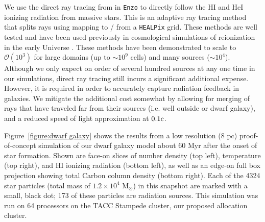 \documentclass[11pt]{article}
\begin{document}
We use the direct ray tracing from \cite{WiseAbel2011} in \texttt{Enzo} to directly follow the HI and HeI ionizing radiation from massive stars. This is an adaptive ray tracing method that splits rays using mapping to / from a \texttt{HEALPix} grid. These methods are well tested and have been used previously in cosmological simulations of reionization in the early Universe \citep{Wise2012a, WiseAbel2012,Wise2014, Kim2013a, Kim2013b}. These methods have been demonstrated to scale to $\mathcal{O}(10^{3})$ for large domains (up to $\sim 10^9$ cells) and many sources ($\sim10^{4}$). Although we only expect on order of several hundred sources at any one time in our simulations, direct ray tracing still incurs a significant additional expense. However, it is required in order to accurately capture radiation feedback in galaxies. We mitigate the additional cost somewhat by allowing for merging of rays that have traveled far from their sources (i.e. well outside or dwarf galaxy), and a reduced speed of light approximation at $0.1\rm{c}$.

Figure~\ref{figure:dwarf galaxy} shows the results from a low resolution (8 pc) proof-of-concept simulation of our dwarf galaxy model about 60 Myr after the onset of star formation. Shown are face-on slices of number density (top left), temperature (top right), and HI ionizing radiation (bottom left), as well as an edge-on full box projection showing total Carbon column density (bottom right). Each of the 4324 star particles (total mass of $1.2\times10^4$ M$_{\odot}$) in this snapshot are marked with a small, black dot; 173 of these particles are radiation sources. This simulation was run on 64 processors on the TACC Stampede cluster, our proposed allocation cluster.
\end{document}
